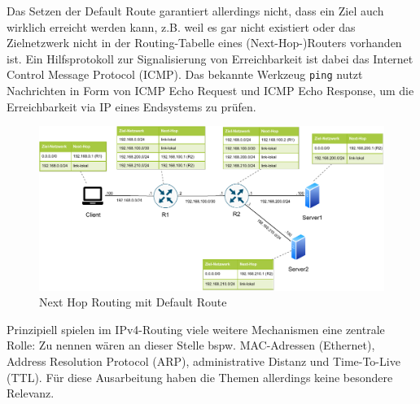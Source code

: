 Das Setzen der Default Route garantiert allerdings nicht, dass ein Ziel auch wirklich erreicht werden kann, z.B. weil es gar nicht existiert oder das Zielnetzwerk nicht in der Routing-Tabelle eines (Next-Hop-)Routers vorhanden ist. Ein Hilfsprotokoll zur Signalisierung von Erreichbarkeit ist dabei das Internet Control Message Protocol (ICMP). Das bekannte Werkzeug \texttt{ping} nutzt Nachrichten in Form von ICMP Echo Request und ICMP Echo Response, um die Erreichbarkeit via IP eines Endsystems zu prüfen.
\begin{figure}[h]
  \centering
  \includegraphics[scale=0.85]{Figures/next_hop_routing_default_route.pdf}
  \caption{Next Hop Routing mit Default Route}
  \label{grafik: next_hop_routing_with_default_route}
\end{figure}\FloatBarrier

Prinzipiell spielen im IPv4-Routing viele weitere Mechanismen eine zentrale Rolle: Zu nennen wären an dieser Stelle bspw. MAC-Adressen (Ethernet), Address Resolution Protocol (ARP), administrative Distanz und Time-To-Live (TTL). Für diese Ausarbeitung haben die Themen allerdings keine besondere Relevanz.\\

